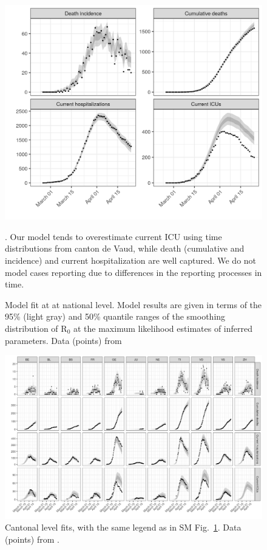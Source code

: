 \begin{figure}[!htb]
    \centering
    \includegraphics[width = .5\textwidth]{fig_covid-switzerland-npi/fig_supp/CH_fits.png}
    \caption[Model fit at at national level]{Model fit at at national level. Model results are given in terms of the 95\% (light gray) and 50\% quantile ranges of the smoothing distribution of R$_0$ at the maximum likelihood estimates of inferred parameters. Data (points) from \parencite{probst_daenuprobstcovid19-cases-switzerland_2020}}. Our model tends to overestimate current ICU using time distributions from canton de Vaud, while death (cumulative and incidence) and current hospitalization are well captured. We do not model cases reporting due to differences in the reporting processes in time.
    \label{fig:chfit}
\end{figure}

\begin{figure}[!htb]
    \centering
    \includegraphics[width = .8\textwidth]{fig_covid-switzerland-npi/fig_supp/caton_fits.png}
    \caption[Cantonal level fits]{Cantonal level fits, with the same legend as in SM Fig.~\ref{fig:chfit}. Data (points) from \parencite{openzh_openzhcovid_19_2020}.}
    \label{fig:cantonfit}
\end{figure}

